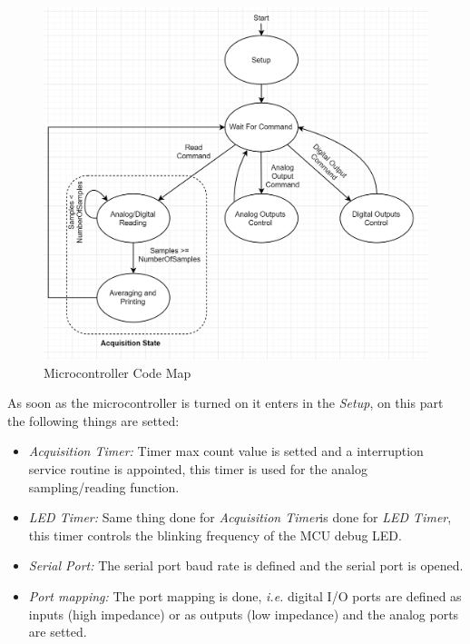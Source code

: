 	\begin{figure}[htbp]
		\centering
		\includegraphics[scale=1]{figuras/fig-microCodeMap}
		\caption{Microcontroller Code Map \cite{microCodeMap}}
		\label{fig:microCode}
	\end{figure}
	
	
	As soon as the microcontroller is turned on it enters in the \textit{Setup}, on this part the following things are setted:
	\begin{itemize}
		\item \textit{Acquisition Timer:} Timer max count value is setted and a interruption service routine is appointed, this timer is used for the analog sampling/reading function.\label{itm:mcu-prog-timer1}
		\item \textit{LED Timer:} Same thing done for \textit{Acquisition Timer}is done for \textit{LED Timer}, this timer controls the blinking frequency of the MCU debug LED.\label{itm:mcu-prog-timer2}
		\item \textit{Serial Port: } The serial port baud rate is defined and the serial port is opened.\label{itm:mcu-prog-serial-port}
		\item \textit{Port mapping: } The port mapping is done, \textit{i.e.} digital I/O ports are defined as inputs (high impedance) or as outputs (low impedance) and the analog ports are setted.\label{itm:mcu-prog-port}
	\end{itemize}
	
